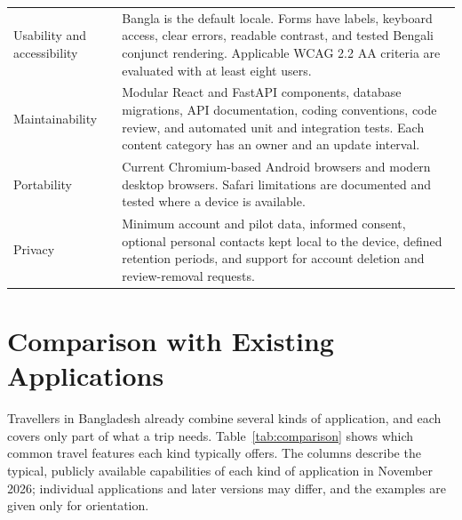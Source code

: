 \documentclass[11pt,a4paper]{article}
\begin{document}
{\begin{longtable}{L{32mm}L{118mm}}
Usability and accessibility & Bangla is the default locale. Forms have labels, keyboard access, clear errors, readable contrast, and tested Bengali conjunct rendering. Applicable WCAG 2.2 AA criteria are evaluated with at least eight users. \\
Maintainability & Modular React and FastAPI components, database migrations, API documentation, coding conventions, code review, and automated unit and integration tests. Each content category has an owner and an update interval. \\
Portability & Current Chromium-based Android browsers and modern desktop browsers. Safari limitations are documented and tested where a device is available. \\
Privacy & Minimum account and pilot data, informed consent, optional personal contacts kept local to the device, defined retention periods, and support for account deletion and review-removal requests. \\
\end{longtable}
}

\section{Comparison with Existing Applications}\label{sec:comparison}
Travellers in Bangladesh already combine several kinds of application, and each covers only part of what a trip needs. Table~\ref{tab:comparison} shows which common travel features each kind typically offers. The columns describe the typical, publicly available capabilities of each kind of application in November 2026; individual applications and later versions may differ, and the examples are given only for orientation.
\end{document}
